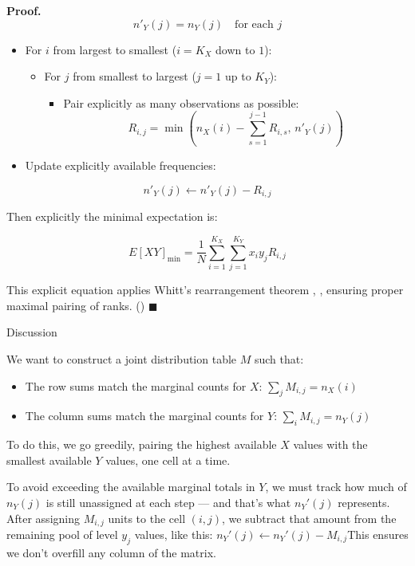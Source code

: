 \documentclass[
  12pt,
]{article}
\providecommand{\tightlist}{%
  \setlength{\itemsep}{0pt}\setlength{\parskip}{0pt}}
\theoremstyle{plain}
\theoremstyle{definition}
\renewenvironment{proof}
   {\par\noindent\textbf{Proof.}\ }
   {\hfill$\blacksquare$\par}
\theoremstyle{remark}
\begin{document}
\begin{proof}
\[n'_Y(j)=n_Y(j)\quad\text{for each }j\]

\begin{itemize}
\item
  For \(i\) from largest to smallest (\(i=K_X\) down to \(1\)):

  \begin{itemize}
  \tightlist
  \item
    For \(j\) from smallest to largest (\(j=1\) up to \(K_Y\)):

    \begin{itemize}
    \tightlist
    \item
      Pair explicitly as many observations as possible:
      \[R_{i,j}=\min\left(n_X(i)-\sum_{s=1}^{j-1}R_{i,s},\, n'_Y(j)\right)\]
    \end{itemize}
  \end{itemize}
\item
  Update explicitly available frequencies:
\end{itemize}

\[n'_Y(j)\leftarrow n'_Y(j)-R_{i,j}\]

Then explicitly the minimal expectation is:

\[E[XY]_{\text{min}}=\frac{1}{N}\sum_{i=1}^{K_X}\sum_{j=1}^{K_Y} x_i y_j R_{i,j}\]

This explicit equation applies Whitt's rearrangement theorem ,
\textcite{whit76-bivariate} , ensuring proper maximal pairing of ranks.
(\textcite{whit76-bivariate})
\end{proof}

Discussion

We want to construct a joint distribution table \(M\) such that:

\begin{itemize}
\item
  The row sums match the marginal counts for \(X\):
  \(\sum_j M_{i,j} = n_X(i)\)
\item
  The column sums match the marginal counts for \(Y\):
  \(\sum_i M_{i,j} = n_Y(j)\)
\end{itemize}

To do this, we go greedily, pairing the highest available \(X\) values
with the smallest available \(Y\) values, one cell at a time.

To avoid exceeding the available marginal totals in \(Y\), we must track
how much of \(n_Y(j)\) is still unassigned at each step --- and that's
what \(n_Y'(j)\) represents.\\
After assigning \(M_{i,j}\) units to the cell \((i,j)\), we subtract
that amount from the remaining pool of level \(y_j\) values, like this:
\(n_Y'(j) \leftarrow n_Y'(j) - M_{i,j}\)This ensures we don't overfill
any column of the matrix.
\end{document}
